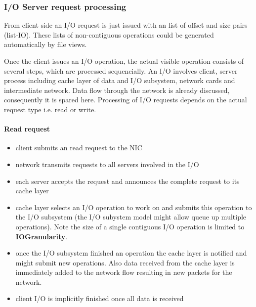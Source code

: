 \documentclass[
     11pt,         %
     a4paper,      %
     BCOR10mm,     %
     DIV14,        %
     liststotoc,   %
     bibtotoc,     %
     idxtotoc,     %
     parskip       %
     ]{scrreprt}   %
\begin{document}
\subsubsection{I/O Server request processing}
From client side an I/O request is just issued with an list of offset and size pairs (list-IO).
These lists of non-contiguous operations could be generated automatically by file views.

Once the client issues an I/O operation, the actual visible operation consists of several steps, which are processed sequencially.
An I/O involves client, server process including cache layer of data and I/O subsystem, network cards and intermediate network. 
Data flow through the network is already discussed, consequently it is spared here.
Processing of I/O requests depends on the actual request type i.e. read or write.

\paragraph{Read request}
\begin{itemize}
 \item client submits an read request to the NIC
 \item network transmits requests to all servers involved in the I/O
 \item each server accepts the request and announces the complete request to its cache layer
 \item cache layer selects an I/O operation to work on and submits this operation to the I/O subsystem (the I/O subystem model might allow queue up multiple operations). Note the size of a single contiguous I/O operation is limited to \textbf{IOGranularity}.
 \item once the I/O subsystem finished an operation the cache layer is notified and might submit new operations. 
 Also data received from the cache layer is immediately added to the network flow resulting in new packets for the network.
 \item client I/O is implicitly finished once all data is received
\end{itemize}
\end{document}

